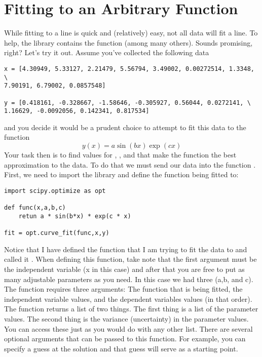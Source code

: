 \section{Fitting to an Arbitrary Function}
While fitting to a line is quick and (relatively) easy, not all data will fit a line. To help,
the  library contains the  function (among many others).  Sounds promising, right?
Let's try it out.  Assume you've collected the following data

\begin{Verbatim}
x = [4.30949, 5.33127, 2.21479, 5.56794, 3.49002, 0.00272514, 1.3348, \
7.90191, 6.79002, 0.0857548]

y = [0.418161, -0.328667, -1.58646, -0.305927, 0.56044, 0.0272141, \
1.16629, -0.0092056, 0.142341, 0.817534]
\end{Verbatim}
and you decide it would be a prudent choice to attempt to fit this
data to the function
\begin{equation}
y(x)  = a \sin(b x) \exp(c x)
\end{equation}
Your task then is to find values for , , and
\code{c} that make the function the best approximation to the data.
To do that we must send our data into the function
\code{curve\_fit}. First, we need to import the library and define the
function being fitted to:
\begin{Verbatim}
import scipy.optimize as opt

def func(x,a,b,c)
    retun a * sin(b*x) * exp(c * x)

fit = opt.curve_fit(func,x,y)
\end{Verbatim}
Notice that I have defined the function that I am trying to fit the
data to and called it .  When defining this function,
take note that the first argument must be the independent variable (x
in this case) and after that you are free to put as many adjustable
parameters as you need.  In this case we had three (a,b, and c).  The
\code{curve\_fit} function requires three arguments: The function that
is being fitted, the independent variable values, and the dependent
variables values (in that order).
The \code{curve\_fit} function returns a list of two things.  The
first thing is a list of the parameter values.  The second thing is
the variance (uncertainty) in the parameter values.  You can access
these just as you would do with any other list.
There are several optional arguments that can be passed to
this function.  For example, you can specify a guess at the solution
and that guess will serve as a starting point.
